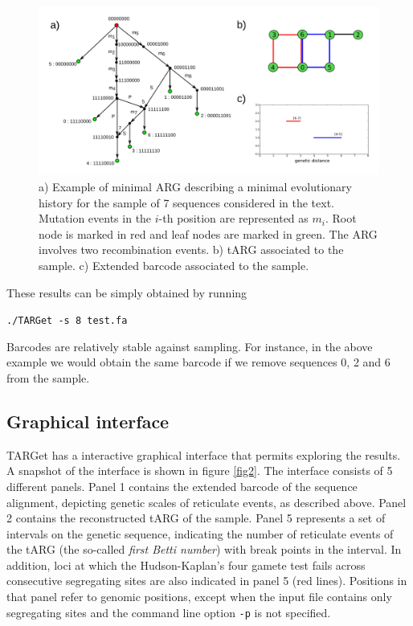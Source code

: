 \documentclass[12pt]{article}
\begin{document}
\begin{figure}[!ht]
\centering
\includegraphics[width=15.8cm, angle=0]{draw.png}
\caption{a) Example of minimal ARG describing a minimal evolutionary history for the sample of 7 sequences considered in the text. Mutation events in the $i$-th position are represented as $m_i$. Root node is marked in red and leaf nodes are marked in green. The ARG involves two recombination events. b) tARG associated to the sample. c) Extended barcode associated to the sample.
\label{fig1}}
\end{figure} 

\noindent These results can be simply obtained by running

\texttt{./TARGet -s 8 test.fa}

\noindent Barcodes are relatively stable against sampling. For instance, in the above example we would obtain the same barcode if we remove sequences 0, 2 and 6 from the sample. 

\subsection*{Graphical interface}

TARGet has a interactive graphical interface that permits exploring the results. A snapshot of the interface is shown in figure \ref{fig2}. The interface consists of 5 different panels. Panel 1 contains the extended barcode of the sequence alignment, depicting genetic scales of reticulate events, as described above. Panel 2 contains the reconstructed tARG of the sample. Panel 5 represents a set of intervals on the genetic sequence, indicating the number of reticulate events of the tARG (the so-called \emph{first Betti number}) with break points in the interval. In addition, loci at which the Hudson-Kaplan's four gamete test \cite{hk} fails across consecutive segregating sites are also indicated in panel 5 (red lines). Positions in that panel refer to genomic positions, except when the input file contains only segregating sites and the command line option \texttt{-p} is not specified. 
\end{document}
